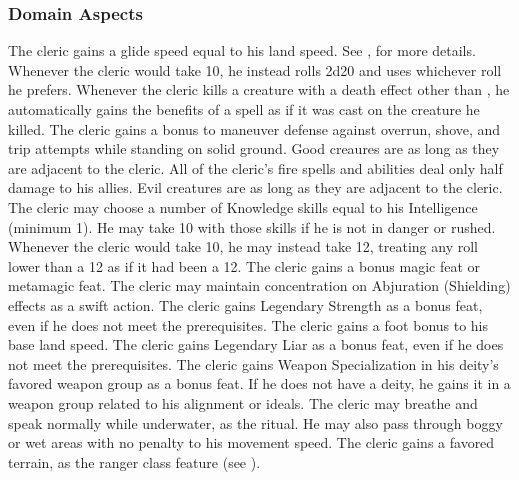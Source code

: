\subsubsection{Domain Aspects}\label{Domain Aspects}

 The cleric gains a glide speed equal to his land speed. See , for more details.
 Whenever the cleric would take 10, he instead rolls 2d20 and uses whichever roll he prefers.
 Whenever the cleric kills a creature with a death effect other than , he automatically gains the benefits of a  spell as if it was cast on the creature he killed.
 The cleric gains a  bonus to maneuver defense against overrun, shove, and trip attempts while standing on solid ground.
 Good creaures are \sickened as long as they are adjacent to the cleric.
 All of the cleric's fire spells and abilities deal only half damage to his allies.
 Evil creatures are \shaken as long as they are adjacent to the cleric.
 The cleric may choose a number of Knowledge skills equal to his Intelligence (minimum 1). He may take 10 with those skills if he is not in danger or rushed.
 Whenever the cleric would take 10, he may instead take 12, treating any roll lower than a 12 as if it had been a 12.
 The cleric gains a bonus magic feat or metamagic feat.
 The cleric may maintain concentration on Abjuration (Shielding) effects as a swift action.
 The cleric gains Legendary Strength as a bonus feat, even if he does not meet the prerequisites.
 The cleric gains a  foot bonus to his base land speed.
 The cleric gains Legendary Liar as a bonus feat, even if he does not meet the prerequisites.
 The cleric gains Weapon Specialization in his deity's favored weapon group as a bonus feat. If he does not have a deity, he gains it in a weapon group related to his alignment or ideals.
 The cleric may breathe and speak normally while underwater, as the  ritual. He may also pass through boggy or wet areas with no penalty to his movement speed.
 The cleric gains a favored terrain, as the ranger class feature (see ).

